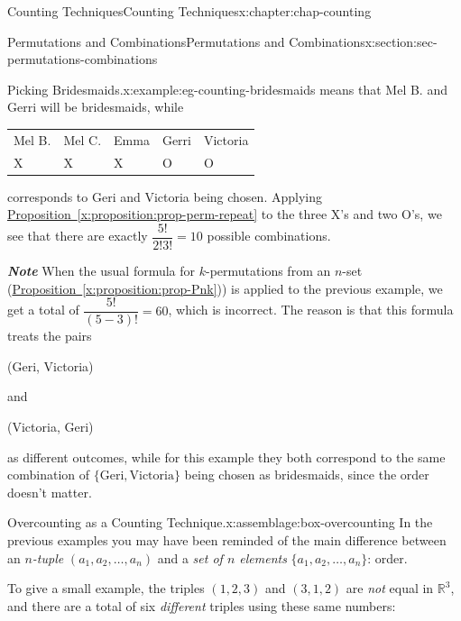 \documentclass[oneside,10pt,]{book}
\newcommand{\tabularfont}{\relax}
\newcommand{\xreffont}{\relax}
\newcommand{\alert}[1]{\textbf{\textit{#1}}}
\numberwithin{equation}{section}
\begin{document}
\begin{chapterptx}{Counting Techniques}{}{Counting Techniques}{}{}{x:chapter:chap-counting}
\begin{sectionptx}{Permutations and Combinations}{}{Permutations and Combinations}{}{}{x:section:sec-permutations-combinations}
\begin{example}{Picking Bridesmaids.}{x:example:eg-counting-bridesmaids}
means that Mel B. and Gerri will be bridesmaids, while%
\begin{sidebyside}{1}{0.225}{0.225}{0}%
\begin{sbspanel}{0.55}%
{\centering%
{\tabularfont%
\begin{tabular}{lllll}
Mel B.&Mel C.&Emma&Gerri&Victoria\tabularnewline[0pt]
X&X&X&O&O
\end{tabular}
}%
\par}
\end{sbspanel}%
\end{sidebyside}%
\par
corresponds to Geri and Victoria being chosen. Applying \hyperref[x:proposition:prop-perm-repeat]{Proposition~{\xreffont\ref{x:proposition:prop-perm-repeat}}} to the three X's and two O's, we see that there are exactly \(\dfrac{5!}{2! 3!} = 10\) possible combinations.%
\par
\alert{Note} When the usual formula for \(k\)-permutations from an \(n\)-set (\hyperref[x:proposition:prop-Pnk]{Proposition~{\xreffont\ref{x:proposition:prop-Pnk}}})) is applied to the previous example, we get a total of \(\dfrac{5!}{(5-3)!} = 60\), which is incorrect. The reason is that this formula treats the pairs%
\begin{sidebyside}{3}{0.2}{0.2}{0}%
\begin{sbspanel}{0.25}%
(Geri, Victoria)%
\end{sbspanel}%
\begin{sbspanel}{0.1}%
\par
and%
\end{sbspanel}%
\begin{sbspanel}{0.25}%
\par
(Victoria, Geri)%
\end{sbspanel}%
\end{sidebyside}%
\par
as different outcomes, while for this example they both correspond to the same combination of \(\{\text{Geri}, \text{Victoria}\}\) being chosen as bridesmaids, since the order doesn't matter.%
\end{example}
\begin{assemblage}{Overcounting as a Counting Technique.}{x:assemblage:box-overcounting}%
In the previous examples you may have been reminded of the main difference between an \emph{\(n\)-tuple} \((a_1,a_2,\ldots,a_n)\) and a \emph{set of \(n\) elements} \(\{a_1,a_2,\ldots,a_n\}\): order.%
\par
To give a small example, the triples \((1,2,3)\) and \((3,1,2)\) are \emph{not} equal in \(\mathbb{R}^3\), and there are a total of six \emph{different} triples using these same numbers:%

\end{assemblage}
\end{sectionptx}
\end{chapterptx}
\end{document}
